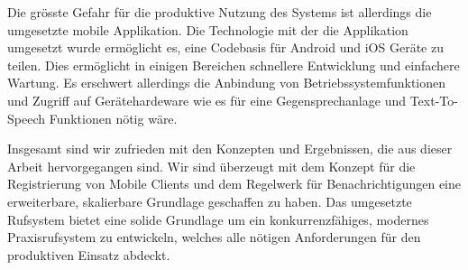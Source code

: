 Die grösste Gefahr für die produktive Nutzung des Systems ist allerdings die umgesetzte mobile Applikation.
Die Technologie mit der die Applikation umgesetzt wurde ermöglicht es, eine Codebasis für Android und iOS Geräte zu teilen.
Dies ermöglicht in einigen Bereichen schnellere Entwicklung und einfachere Wartung.
Es erschwert allerdings die Anbindung von Betriebssystemfunktionen und Zugriff auf Gerätehardeware wie es für eine Gegensprechanlage und Text-To-Speech Funktionen nötig wäre.

Insgesamt sind wir zufrieden mit den Konzepten und Ergebnissen, die aus dieser Arbeit hervorgegangen sind.
Wir sind überzeugt mit dem Konzept für die Registrierung von Mobile Clients und dem Regelwerk für Benachrichtigungen eine erweiterbare, skalierbare Grundlage geschaffen zu haben.
Das umgesetzte Rufsystem bietet eine solide Grundlage um ein konkurrenzfähiges, modernes Praxisrufsystem zu entwickeln, welches alle nötigen Anforderungen für den produktiven Einsatz abdeckt.
